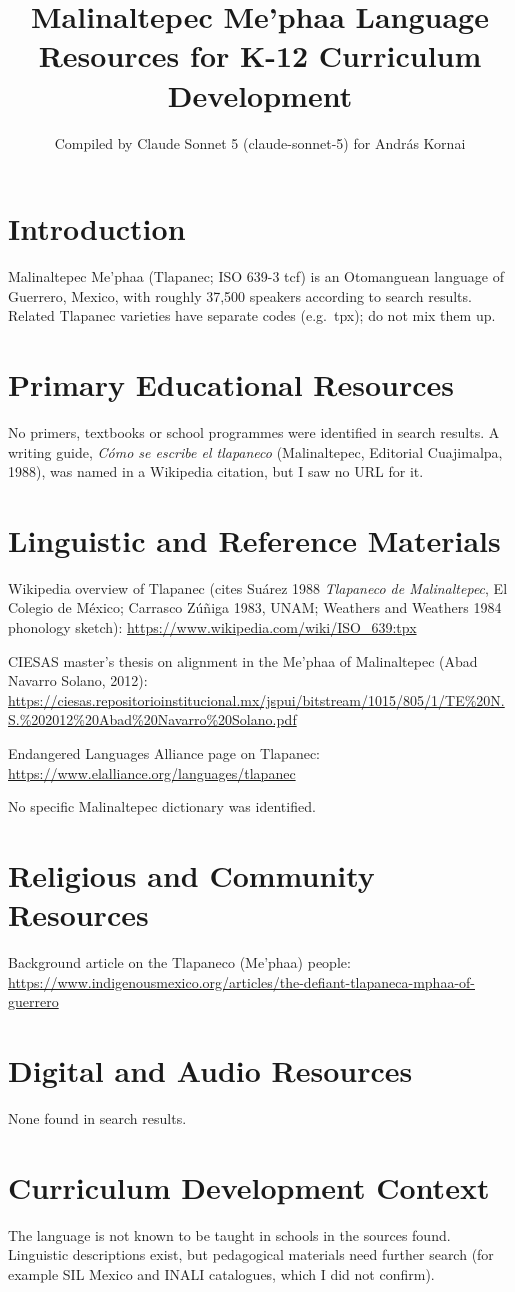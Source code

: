 \documentclass[12pt]{article}
\title{Malinaltepec Me'phaa Language Resources for K-12 Curriculum Development}
\author{Compiled by Claude Sonnet 5 (claude-sonnet-5) for Andr\'as Kornai}
\date{}
\begin{document}
\maketitle
\section{Introduction}
Malinaltepec Me'phaa (Tlapanec; ISO 639-3 tcf) is an Otomanguean language of Guerrero, Mexico, with roughly 37,500 speakers according to search results. Related Tlapanec varieties have separate codes (e.g.\ tpx); do not mix them up.
\section{Primary Educational Resources}
No primers, textbooks or school programmes were identified in search results. A writing guide, \emph{C\'omo se escribe el tlapaneco} (Malinaltepec, Editorial Cuajimalpa, 1988), was named in a Wikipedia citation, but I saw no URL for it.
\section{Linguistic and Reference Materials}
Wikipedia overview of Tlapanec (cites Su\'arez 1988 \emph{Tlapaneco de Malinaltepec}, El Colegio de M\'exico; Carrasco Z\'u\~niga 1983, UNAM; Weathers and Weathers 1984 phonology sketch): \url{https://www.wikipedia.com/wiki/ISO_639:tpx}

CIESAS master's thesis on alignment in the Me'phaa of Malinaltepec (Abad Navarro Solano, 2012): \url{https://ciesas.repositorioinstitucional.mx/jspui/bitstream/1015/805/1/TE%20N.S.%202012%20Abad%20Navarro%20Solano.pdf}

Endangered Languages Alliance page on Tlapanec: \url{https://www.elalliance.org/languages/tlapanec}

No specific Malinaltepec dictionary was identified.
\section{Religious and Community Resources}
Background article on the Tlapaneco (Me'phaa) people: \url{https://www.indigenousmexico.org/articles/the-defiant-tlapaneca-mphaa-of-guerrero}
\section{Digital and Audio Resources}
None found in search results.
\section{Curriculum Development Context}
The language is not known to be taught in schools in the sources found. Linguistic descriptions exist, but pedagogical materials need further search (for example SIL Mexico and INALI catalogues, which I did not confirm).
\end{document}
